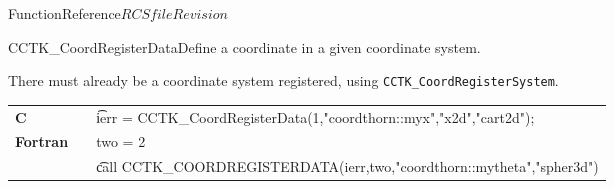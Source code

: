 \begin{cactuspart}{FunctionReference}{$RCSfile$}{$Revision$}
\begin{CCTKFunc}{CCTK\_CoordRegisterData}{Define a coordinate in a given coordinate
system.}
\label{CCTK-CoordRegisterData}
\showargs
\begin{params}
\end{params}
\begin{discussion}
There must already be a coordinate system registered,
using {\tt CCTK\_CoordRegisterSystem}.
\end{discussion}
\begin{examples}
\begin{tabular}{@{}p{3cm}cp{11cm}}
\hfill {\bf C} && {\t ierr = CCTK\_CoordRegisterData(1,"coordthorn::myx","x2d","cart2d")};
\\
\hfill {\bf Fortran} && two = 2
\\
&&{\t call CCTK\_COORDREGISTERDATA(ierr,two,"coordthorn::mytheta","spher3d")}
\\
\end{tabular}
\end{examples}
\begin{errorcodes}
\end{errorcodes}
\end{CCTKFunc}


\end{cactuspart}
